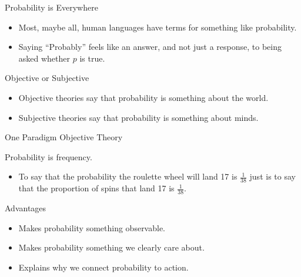 \documentclass[
  ignorenonframetext,
]{beamer}
\providecommand{\tightlist}{%
  \setlength{\itemsep}{0pt}\setlength{\parskip}{0pt}}
\renewcommand{\,}{\text{, }}
\begin{document}
\begin{frame}{Probability is Everywhere}
\protect\hypertarget{probability-is-everywhere}{}

\begin{itemize}
\tightlist
\item
  Most, maybe all, human languages have terms for something like
  probability. \pause
\item
  Saying ``Probably'' feels like an answer, and not just a response, to
  being asked whether \(p\) is true.
\end{itemize}

\end{frame}

\begin{frame}{Objective or Subjective}
\protect\hypertarget{objective-or-subjective}{}

\begin{itemize}
\tightlist
\item
  Objective theories say that probability is something about the world.
\item
  Subjective theories say that probability is something about minds.
\end{itemize}

\end{frame}

\begin{frame}{One Paradigm Objective Theory}
\protect\hypertarget{one-paradigm-objective-theory}{}

Probability is frequency.

\begin{itemize}
\tightlist
\item
  To say that the probability the roulette wheel will land 17 is
  \(\frac{1}{38}\) just is to say that the proportion of spins that land
  17 is \(\frac{1}{38}\).
\end{itemize}

\end{frame}

\begin{frame}{Advantages}
\protect\hypertarget{advantages}{}

\begin{itemize}
\tightlist
\item
  Makes probability something observable. \pause
\item
  Makes probability something we clearly care about. \pause
\item
  Explains why we connect probability to action.
\end{itemize}

\end{frame}
\end{document}
